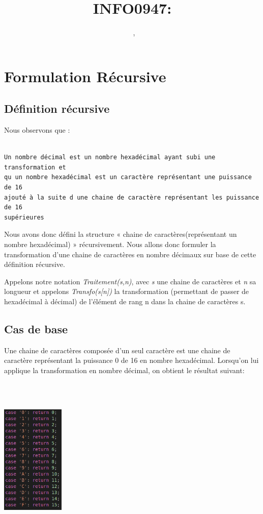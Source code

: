 \documentclass[a4paper, 11pt, oneside]{article}
\title{INFO0947: \intitule}
\author{\textsc{\Prenom}~\textsc{\Nom}, \matricule}
\date{}
\newcommand{\tablemat}{~}
\renewcommand{\tablemat}{\tableofcontents}
\begin{document}
\maketitle
\newpage
\tablemat
\newpage


\section{Formulation Récursive}\label{formulation}
\subsection{Définition récursive}
Nous observons que :

\begin{lstlisting}

Un nombre décimal est un nombre hexadécimal ayant subi une transformation et 
qu un nombre hexadécimal est un caractère représentant une puissance de 16
ajouté à la suite d une chaine de caractère représentant les puissance de 16
supérieures

\end{lstlisting}

Nous avons donc défini la structure « chaine de caractères(représentant un nombre
hexadécimal) »  récursivement. Nous allons donc formuler la transformation d’une
chaine de caractères en nombre décimaux sur base de cette définition récursive.

Appelons notre notation \textit{Traitement(s,n)}, avec \textit{s} une chaine de
caractères et \textit{n} sa longueur et appelons \textit{Transfo(s[n])} la 
transformation (permettant de passer de hexadécimal à décimal) de l'élément de 
rang n dans la chaine de caractères s.

\subsection{Cas de base}

Une chaine de caractères composée d'un seul caractère est une chaine de caractère
représentant la puissance 0 de 16 en nombre hexadécimal.
Lorsqu'on lui applique la transformation en nombre décimal, on obtient le résultat suivant: 

\centerline{\includegraphics[height=8cm, width=3cm]{AA.png}}
\end{document}
